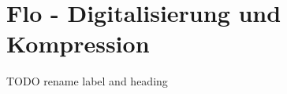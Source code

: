 \section{Flo - Digitalisierung und Kompression}\label{sec:digitalisation}

TODO rename label and heading

\cite{anno4j3}